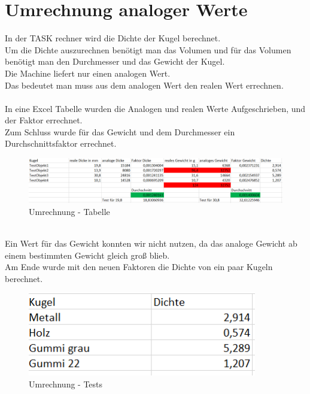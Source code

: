 \section{Umrechnung analoger Werte}\label{Umrechnung analoger Werte}
In der TASK rechner wird die Dichte der Kugel berechnet.\\
Um die Dichte auszurechnen benötigt man das Volumen und für das Volumen benötigt man den Durchmesser und das Gewicht der Kugel.\\
Die Machine liefert nur einen analogen Wert.\\
Das bedeutet man muss aus dem analogen Wert den realen Wert errechnen.\\
\\
In eine Excel Tabelle wurden die Analogen und realen Werte Aufgeschrieben, und der Faktor errechnet.\\
Zum Schluss wurde für das Gewicht und dem Durchmesser ein Durchschnittsfaktor errechnet.\\
\begin{figure}[h]
\begin{center}
\includegraphics[width=15cm]{grafiken/UmrechnungsTabelle.png}
\caption{Umrechnung - Tabelle}
\label{Umrechnung}
\end{center}
\end{figure}
\\
Ein Wert für das Gewicht konnten wir nicht nutzen, da das analoge Gewicht ab einem bestimmten Gewicht gleich groß blieb.\\
Am Ende wurde mit den neuen Faktoren die Dichte von ein paar Kugeln berechnet.\\
\begin{figure}[h]
\begin{center}
\includegraphics[width=10cm]{grafiken/UmrechnungTests.png}
\caption{Umrechnung - Tests}
\label{Umrechnung}
\end{center}
\end{figure}
\newpage





